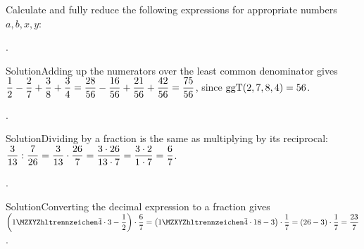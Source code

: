 \begin{MExercises}
\begin{MExercise}
Calculate and fully reduce the following expressions for appropriate numbers $a,b,x,y$:
\begin{MExerciseItems}
\item{. \begin{MHint}{Solution}Adding up the numerators over the least common denominator gives $\dfrac{1}{2}-\dfrac{2}{7}+\dfrac{3}{8}+\dfrac{3}{4}=\dfrac{28}{56}-\dfrac{16}{56}+\dfrac{21}{56}+\dfrac{42}{56}=\dfrac{75}{56}$, since $\mathrm{ggT}(2,7,8,4)=56$.\end{MHint}}
\item{. \begin{MHint}{Solution}Dividing by a fraction is the same as multiplying by its reciprocal: $\dfrac{3}{13}:\dfrac{7}{26}=\dfrac{3}{13}\cdot\dfrac{26}{7}=\dfrac{3\cdot 26}{13\cdot 7}=\dfrac{3\cdot 2}{1\cdot 7}=\dfrac{6}{7}$.\end{MHint}}
\item{. \begin{MHint}{Solution}Converting the decimal expression to a fraction gives 
$\left(\MZahl{1}{}\bar{4}\cdot 3-\Mdfrac12\right)\cdot\Mdfrac{6}{7}=\left(\MZahl{1}{}\bar{4}\cdot 18-3\right)\cdot\Mdfrac{1}{7}=\left(26-3\right)\cdot\Mdfrac{1}{7}=\Mdfrac{23}{7}$.\end{MHint}}
\end{MExerciseItems}
\end{MExercise}


\end{MExercises}
